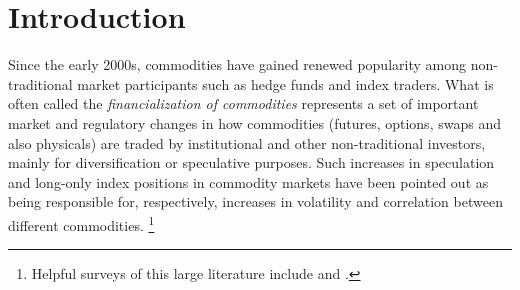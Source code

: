 \documentclass[12pt]{article}
\begin{document}
\section{Introduction} \label{sec:introduction}


Since the early 2000s, commodities have gained renewed popularity among non-traditional market participants such as hedge funds and index traders. What is often called the \emph{financialization of commodities} represents a set of important market and regulatory changes in how commodities (futures, options, swaps and also physicals) are traded by institutional and other non-traditional investors, mainly for diversification or speculative purposes. Such increases in speculation and long-only index positions in commodity markets have been pointed out as being responsible for, respectively, increases in volatility and correlation between different commodities. \footnote{Helpful surveys of this large literature include \citet{boyd2018update} and \citet{cheng2014financialization}.}
\end{document}

